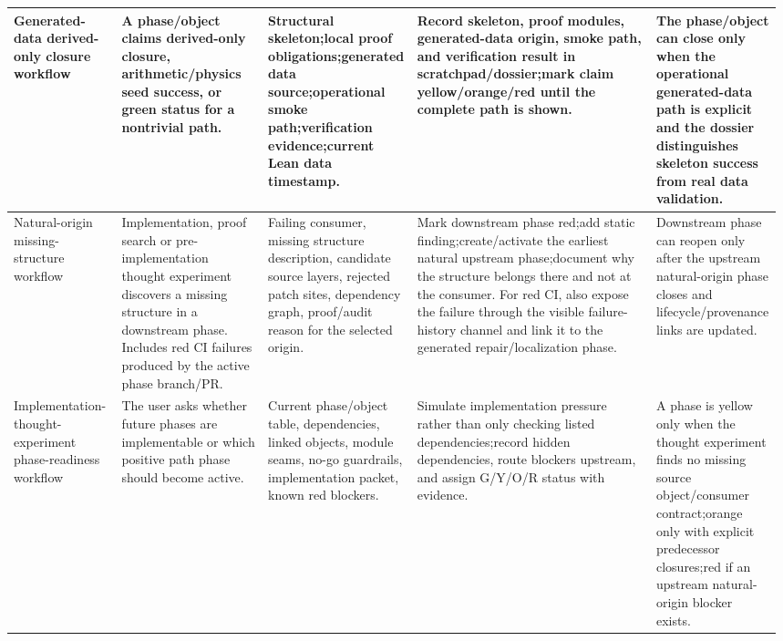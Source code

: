 \begin{longtable}{L{0.14\linewidth} L{0.19\linewidth} L{0.18\linewidth} L{0.31\linewidth} L{0.16\linewidth}}
\hline
\addlinespace[0.24em]
Generated-data derived-only closure workflow & A phase/\allowbreak{}object claims derived-only closure, arithmetic/\allowbreak{}physics seed success, or green status for a nontrivial path. & Structural skeleton;\newline local proof obligations;\newline generated data source;\newline operational smoke path;\newline verification evidence;\newline current Lean data timestamp. & Record skeleton, proof modules, generated-data origin, smoke path, and verification result in scratchpad/\allowbreak{}dossier;\newline mark claim yellow/\allowbreak{}orange/\allowbreak{}red until the complete path is shown. & The phase/\allowbreak{}object can close only when the operational generated-data path is explicit and the dossier distinguishes skeleton success from real data validation.\\
\hline
\addlinespace[0.24em]
Natural-origin missing-structure workflow & Implementation, proof search or pre-implementation thought experiment discovers a missing structure in a downstream phase. Includes red CI failures produced by the active phase branch/\allowbreak{}PR. & Failing consumer, missing structure description, candidate source layers, rejected patch sites, dependency graph, proof/\allowbreak{}audit reason for the selected origin. & Mark downstream phase red;\newline add static finding;\newline create/\allowbreak{}activate the earliest natural upstream phase;\newline document why the structure belongs there and not at the consumer. For red CI, also expose the failure through the visible failure-history channel and link it to the generated repair/\allowbreak{}localization phase. & Downstream phase can reopen only after the upstream natural-origin phase closes and lifecycle/\allowbreak{}provenance links are updated.\\
\hline
\addlinespace[0.24em]
Implementation-thought-experiment phase-readiness workflow & The user asks whether future phases are implementable or which positive path phase should become active. & Current phase/\allowbreak{}object table, dependencies, linked objects, module seams, no-go guardrails, implementation packet, known red blockers. & Simulate implementation pressure rather than only checking listed dependencies;\newline record hidden dependencies, route blockers upstream, and assign G/\allowbreak{}Y/\allowbreak{}O/\allowbreak{}R status with evidence. & A phase is yellow only when the thought experiment finds no missing source object/\allowbreak{}consumer contract;\newline orange only with explicit predecessor closures;\newline red if an upstream natural-origin blocker exists.\\

\end{longtable}
